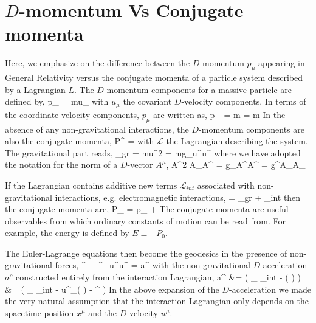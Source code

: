 \section{$D$-momentum Vs Conjugate momenta}
\label{ApC}

Here, we emphasize on the difference between the $D$-momentum $p_{\mu}$ appearing in General Relativity versus the conjugate momenta of a particle system described by a Lagrangian $L$. The $D$-momentum components for a massive particle are defined by,
\be
	p_{\mu} = mu_{\mu}
\ee
with $u_{\mu}$ the covariant $D$-velocity components. In terms of the coordinate velocity components, $p_{\mu}$ are written as,
\be
	p_{\mu} = m = m
\ee
In the absence of any non-gravitational interactions, the $D$-momentum components are also the conjugate momenta,
\be
	P^{\mu} = 
\ee
with $\mathcal{L}$ the Lagrangian describing the system. The gravitational part reads,
\be
	_{gr} = mu^2 = mg_{\mu\nu}u^{\mu}u^{\nu}
\ee
where we have adopted the notation for the norm of a $D$-vector $A^{\mu}$,
\be
	A^2 \equiv A_{\mu}A^{\mu} = g_{\mu\nu}A^{\mu}A^{\nu} = g^{\mu\nu}A_{\mu}A_{\nu}
\ee

If the Lagrangian contains additive new terms $\mathcal{L}_{int}$ associated with non-gravitational interactions, e.g. electromagnetic interactions,
\be
	 = _{gr} + _{int}
\ee
then the conjugate momenta are,
\be
	P_{\mu} = p_{\mu} + 
\ee
The conjugate momenta are useful observables from which ordinary constants of motion can be read from. For example, the energy is defined by $E \equiv -P_{0}$.

The Euler-Lagrange equations then become the geodesics in the presence of non-gravitational forces,
\be
	^{\rho} + \Gamma^{\rho}_{\mu\nu}u^{\mu}u^{\nu} = a^{\rho}
\ee
with the non-gravitational $D$-acceleration $a^{\rho}$ constructed entirely from the interaction Lagrangian,
\be\ba
	a^{\rho} &= \left( \partial_{\mu} _{int} - \left(  \right) \right) \\
	&= \left( \partial_{\mu} _{int} - u^{\nu}\partial_{\nu}\left(  \right) - ^{\nu} \right)
\ea\ee
In the above expansion of the $D$-acceleration we made the very natural assumption that the interaction Lagrangian only depends on the spacetime position $x^{\mu}$ and the $D$-velocity $u^{\mu}$.

